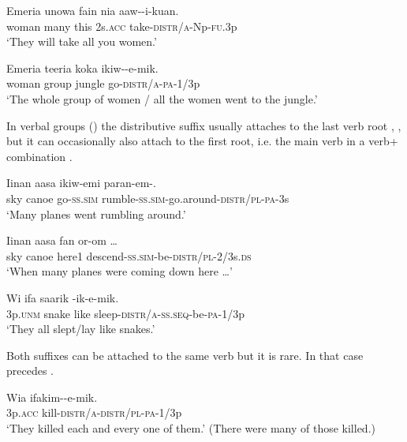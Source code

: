 \ea%
\label{ex:3:x492}
\gll Emeria unowa fain nia aaw--i-kuan. \\
woman many this 2s.\textsc{acc} take-\textsc{distr}/\textsc{a}-Np-\textsc{fu}.3p\\
\glt`They will take all you women.'
\z

\ea%
\label{ex:3:x491}
\gll Emeria teeria koka ikiw--e-mik. \\
woman group jungle go-\textsc{distr}/\textsc{a}-\textsc{pa}-1/3p\\
\glt`The whole group of women / all the women went to the jungle.'
\z

In verbal groups () the distributive suffix usually attaches to the last verb root , , but it can occasionally also attach to the first root, i.e. the main verb in a verb+ combination .

\ea%
\label{ex:3:x207}
\gll Iinan aasa ikiw-emi paran-em-. \\
sky canoe go-\textsc{ss}.\textsc{sim} rumble-\textsc{ss}.\textsc{sim}-go.around-\textsc{distr}/\textsc{pl}-\textsc{pa}-3s\\
\glt `Many planes went rumbling around.'
\z

\ea%
\label{ex:3:x490}
\gll Iinan aasa fan or-om {\dots} \\
sky canoe here1 descend-\textsc{ss}.\textsc{sim}-be-\textsc{distr}/\textsc{pl}-2/3s.\textsc{ds}\\
\glt`When many planes were coming down here {\dots}'
\z

\ea%
\label{ex:3:x208}
\gll Wi ifa saarik -ik-e-mik. \\
3p.\textsc{unm} snake like sleep-\textsc{distr}/\textsc{a}-\textsc{ss}.\textsc{seq}-be-\textsc{pa}-1/3p \\
\glt`They all slept/lay like snakes.'
\z

Both suffixes can be attached to the same verb but it is rare. In that case \textstyleEmphasizedVernacularWords{\nobreakdash-} precedes \textstyleEmphasizedVernacularWords{\nobreakdash-} .

\ea%
\label{ex:3:x206}
\gll Wia ifakim--e-mik. \\
3p.\textsc{acc} kill-\textsc{distr}/\textsc{a}-\textsc{distr}/\textsc{pl}-\textsc{pa}-1/3p \\
\glt`They killed each and every one of them.' (There were many of those killed.) 
\z

